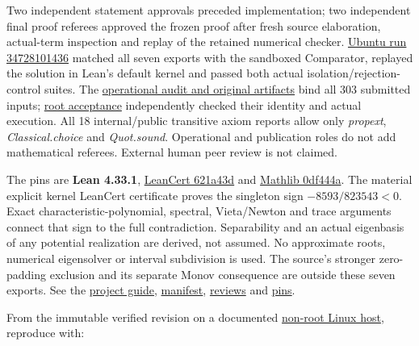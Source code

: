 \documentclass[11pt,a4paper]{article}
\begin{document}
Two independent statement approvals preceded implementation; two
independent final proof referees approved the frozen proof after fresh
source elaboration, actual-term inspection and replay of the retained
numerical checker.
\href{https://github.com/sgstepaniants/OpenProblemsInNLA/actions/runs/34728101436}{Ubuntu
run 34728101436} matched all seven exports with the sandboxed
Comparator, replayed the solution in Lean's default kernel and passed
both actual isolation/rejection-control suites. The
\href{https://github.com/ajt60gaibb/OpenProblemsInNLA/blob/main/eigenvalues-and-inverse-problems/IS-03/lean/verification/linux-2026-09-12}{operational
audit and original artifacts} bind all 303 submitted inputs;
\href{https://github.com/ajt60gaibb/OpenProblemsInNLA/blob/main/eigenvalues-and-inverse-problems/IS-03/lean/verification/root-operational-2026-09-12/ROOT-CHECKS.json}{root
acceptance} independently checked their identity and actual execution.
All 18 internal/public transitive axiom reports allow only
\textit{propext}, \textit{Classical.choice} and \textit{Quot.sound}.
Operational and publication roles do not add mathematical referees.
External human peer review is not claimed.

The pins are \textbf{Lean 4.33.1},
\href{https://github.com/alerad/leancert/tree/621a43d7cf21f87872392a01e874f2f1dbddc926}{LeanCert
621a43d} and
\href{https://github.com/leanprover-community/mathlib4/tree/0df444a360eaa60ab8c11dca51a86af692955474}{Mathlib
0df444a}. The material explicit kernel LeanCert certificate proves the
singleton sign \(-8593/823543<0\). Exact characteristic-polynomial,
spectral, Vieta/Newton and trace arguments connect that sign to the full
contradiction. Separability and an actual eigenbasis of any potential
realization are derived, not assumed. No approximate roots, numerical
eigensolver or interval subdivision is used. The source's stronger
zero-padding exclusion and its separate Monov consequence are outside
these seven exports. See the
\href{https://github.com/ajt60gaibb/OpenProblemsInNLA/blob/main/eigenvalues-and-inverse-problems/IS-03/lean/README.md}{project
guide},
\href{https://github.com/ajt60gaibb/OpenProblemsInNLA/blob/main/eigenvalues-and-inverse-problems/IS-03/lean/formalization.yaml}{manifest},
\href{https://github.com/ajt60gaibb/OpenProblemsInNLA/blob/main/eigenvalues-and-inverse-problems/IS-03/lean/reviews}{reviews}
and
\href{https://github.com/ajt60gaibb/OpenProblemsInNLA/blob/main/eigenvalues-and-inverse-problems/IS-03/lean/lake-manifest.json}{pins}.

From the immutable verified revision on a documented
\href{https://github.com/ajt60gaibb/OpenProblemsInNLA/blob/main/tools/lean/HARNESS.md}{non-root
Linux host}, reproduce with:
\end{document}
